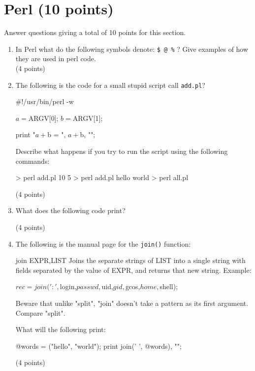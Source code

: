 \documentclass[11pt]{article}
\begin{document}
\section{Perl (10 points)}
Answer questions giving a total of 10 points for this section.
\begin{enumerate}
\item In Perl what do the following symbols denote: \verb|$ @ %| ? Give
  examples of how they are used in perl code.\\
(4 points)

\item The following is the code for a small stupid script call \texttt{add.pl}?

  \begin{perlcode}
  #!/usr/bin/perl -w
    
  $a = $ARGV[0];
  $b = $ARGV[1];

  print "$a + $b = ", $a + $b, "\n";
    
  \end{perlcode}

  Describe what happens if you try to run the script using the following
  commands:\\
  \begin{consolecode}
 > perl add.pl 10 5
 > perl add.pl hello world
 > perl all.pl
  \end{consolecode}
  (4 points)
\item What does the following code print?

(4 points)

\item The following is the manual page for the \texttt{join()} function:\\
  \begin{consolecode}
join EXPR,LIST
  Joins the separate strings of LIST into a single string with
  fields separated by the value of EXPR, and returns that new
  string.
  Example:
  
  $rec = join(':',
              $login,$passwd,$uid,$gid,$gcos,$home,$shell);
  
  Beware that unlike "split", "join" doesn't take a pattern
  as its first argument.  Compare "split".
  \end{consolecode}

  What will the following print:

  \begin{perlcode}
    @words = ("hello", "world");
    print join(' ', @words), "\n";
  \end{perlcode}
(4 points)  
\end{enumerate}
\end{document}
